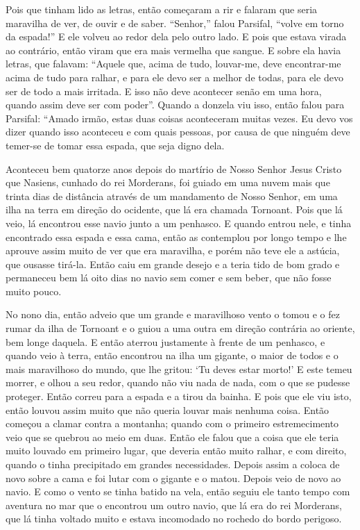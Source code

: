  Pois que tinham lido as letras, então começaram a rir e falaram que seria
maravilha de ver, de ouvir e de saber. “Senhor,” falou Parsifal, “volve em
torno da espada!” E ele volveu ao redor dela pelo outro lado. E pois que
estava virada ao contrário, então viram que era mais vermelha que sangue. E
sobre ela havia letras, que falavam: “Aquele que, acima de tudo, louvar-me,
deve encontrar-me acima de tudo para ralhar, e para ele devo ser a melhor de
todas, para ele devo ser de todo a mais irritada. E isso não deve acontecer
senão em uma hora, quando assim deve ser com poder”. Quando a donzela viu isso,
então falou para Parsifal: “Amado irmão, estas duas coisas aconteceram muitas
vezes. Eu devo vos dizer quando isso aconteceu e com quais pessoas, por causa
de que ninguém deve temer-se de tomar essa espada, que seja digno dela.

 Aconteceu bem quatorze anos depois do martírio de Nosso Senhor Jesus Cristo que
Nasiens, cunhado do rei Morderans, foi guiado em uma nuvem mais que trinta dias
de distância através de um mandamento de Nosso Senhor, em uma ilha na terra em
direção do ocidente, que lá era chamada Tornoant. Pois que lá veio, lá
encontrou esse navio junto a um penhasco. E quando entrou nele, e tinha
encontrado essa espada e essa cama, então as contemplou por longo tempo e lhe
aprouve assim muito de ver que era maravilha, e porém não teve ele a astúcia,
que ousasse tirá-la. Então caiu em grande desejo e a teria tido de bom grado e
permaneceu bem lá oito dias no navio sem comer e sem beber, que não fosse muito
pouco.

No nono dia, então adveio que um grande e maravilhoso vento o tomou e o fez
rumar da ilha de Tornoant e o guiou a uma outra em direção contrária ao
oriente, bem longe daquela. E então aterrou justamente à frente de um penhasco,
e quando veio à terra, então encontrou na ilha um gigante, o maior de todos e o
mais maravilhoso do mundo, que lhe gritou: ‘Tu deves estar morto!’ E este
temeu morrer, e olhou a seu redor, quando não viu nada de nada, com o que se
pudesse proteger. Então correu para a espada e a tirou da bainha. E pois que
ele viu isto, então louvou assim muito que não queria louvar mais nenhuma
coisa. Então começou a clamar contra a montanha; quando com o primeiro
estremecimento veio que se quebrou ao meio em duas. Então ele falou que a coisa
que ele teria muito louvado em primeiro lugar, que deveria então muito ralhar,
e com direito, quando o tinha precipitado em grandes necessidades. Depois assim
a coloca de novo sobre a cama e foi lutar com o gigante e o matou. Depois veio
de novo ao navio. E como o vento se tinha batido na vela, então seguiu ele
tanto tempo com aventura no mar que o encontrou um outro navio, que lá era do
rei Morderans, que lá tinha voltado muito e estava incomodado no rochedo do
bordo perigoso. 

